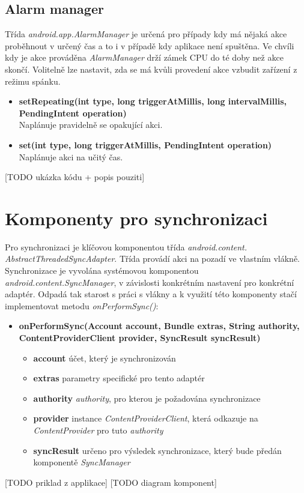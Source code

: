 \documentclass{diplomka}
\begin{document}
\subsection{Alarm manager}
Třída \emph{android.app.AlarmManager} je určená pro případy kdy má nějaká akce proběhnout v určený čas a to i v případě kdy aplikace není spuštěna. Ve chvíli kdy je akce prováděna \emph{AlarmManager} drží zámek CPU do té doby než akce skončí. Volitelně lze nastavit, zda se má kvůli provedení akce vzbudit zařízení z režimu spánku.
\begin{itemize}[]
\item \textbf{setRepeating(int type, long triggerAtMillis, long intervalMillis, PendingIntent operation)}\\
Naplánuje pravidelně se opakující akci.
\item \textbf{set(int type, long triggerAtMillis, PendingIntent operation)}\\
Naplánuje akci na učitý čas.
\end{itemize}

[TODO ukázka kódu + popis pouziti]

\section{Komponenty pro synchronizaci}
Pro synchronizaci je klíčovou komponentou třída \emph{android.content.\\AbstractThreadedSyncAdapter}. Třída provádí akci na pozadí ve vlastním vlákně. Synchronizace je vyvolána systémovou komponentou \emph{android.content.SyncManager}, v závislosti konkrétním nastavení pro konkrétní adaptér. Odpadá tak starost s práci s vlákny a k využití této komponenty stačí implementovat metodu \emph{onPerformSync()}:
\begin{itemize}[]
\item \textbf{onPerformSync(Account account, Bundle extras, String authority, ContentProviderClient provider, SyncResult syncResult)}\\
\begin{itemize}[]
\item  \textbf{account} účet, který je synchronizován
\item  \textbf{extras} parametry specifické pro tento adaptér
\item  \textbf{authority} \emph{authority}, pro kterou je požadována synchronizace
\item  \textbf{provider} instance \emph{ContentProviderClient}, která odkazuje na \emph{ContentProvider} pro tuto \emph{authority}
\item  \textbf{syncResult} určeno pro výsledek synchronizace, který bude předán komponentě \emph{SyncManager}
\end{itemize}
\end{itemize}
[TODO priklad z applikace]
[TODO diagram komponent]
\end{document}
